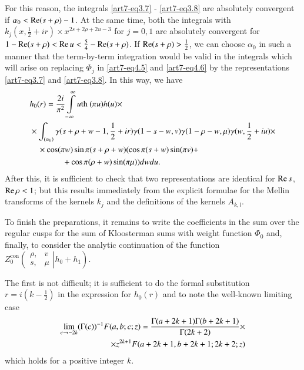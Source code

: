 For this reason, the integrals \eqref{art7-eq3.7} - \eqref{art7-eq3.8} are absolutely convergent if $\alpha_0 < \operatorname{Re} (s + \rho) -1$. At the same time, both the integrals with $k_j (x, \frac{1}{2} + ir) \times x^{2s+ 2 \rho  + 2 u -3}$ for $j =0,1$ are absolutely convergent for $1-\operatorname{Re} (s+ \rho ) < \operatorname{Re} u < \frac{5}{4} - \operatorname{Re} (s+ \rho)$. If $\operatorname{Re} (s+ \rho) > \frac{1}{2}$, we can choose $\alpha_0$ in such a manner that the term-by-term integration would be valid in the integrals which will arise on replacing $\Phi_j$ in \eqref{art7-eq4.5} and \eqref{art7-eq4.6} by the representations \eqref{art7-eq3.7} and \eqref{art7-eq3.8}. In this way, we have 
{\fontsize{10}{12}\selectfont
\begin{align}
& h_0(r) = \frac{2i}{\pi^2} \int\limits^\infty_{-\infty} u \text{th }(\pi u) h (u) \times \label{art7-eq4.13} \\
& \times \int_{(\alpha_0)} \gamma (s+ \rho+ w -1,\frac{1}{2} + ir) \gamma (1-s-w, v) \gamma (1-\rho - w, \mu) \gamma (w, \frac{1}{2} 
+ iu) \times \notag\\
& \quad \times \cos (\pi w) \sin \pi (s+ \rho + w) (\cos\pi (s+w) \sin (\pi v) + \notag\\
& \qquad \qquad + \cos \pi (\rho + w) \sin (\pi \mu) ) dw du. \notag 
\end{align}}\pageoriginale
After this, it is sufficient to check that two representations are identical for $\operatorname{Re} s$, $\operatorname{Re} \rho <1$; but this results immediately from the explicit formulae for the Mellin transforms of the kernels $k_j$ and the definitions of the kernels $A_{k,l}$.

To finish the preparations, it remains to write the coefficients in the sum over the regular cusps for the sum of Kloosterman sums with weight function $\Phi_0$ and, finally, to consider the analytic continuation of the function $Z^{\text{con}}_0 
\left(
\left.
\begin{matrix}
\rho, & v \\
s, & \mu 
\end{matrix}
\right| h_0 + h_1
\right)$.

The first is not difficult; it is sufficient to do the formal substitution $r = i (k -\frac{1}{2})$ in the expression for $h_0(r)$ and to note the well-known limiting case
\begin{align}
\lim\limits_{c \to - 2k } (\Gamma (c))^{-1} F (a, b; c; z) = \frac{\Gamma (a+ 2 k + 1) \Gamma (b+ 2 k + 1)}{\Gamma (2k + 2)} \times \label{art7-eq4.14}\\
\times z^{2k + 1} F (a+ 2k + 1, b + 2 k + 1 ; 2 k + 2; z) \notag
\end{align}
which holds for a positive integer $k$.

